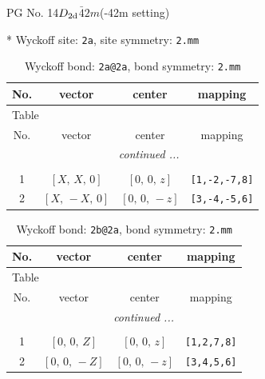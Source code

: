 \documentclass[fleqn,8pt]{jsarticle}
\begin{document}
\setcounter{MaxMatrixCols}{32}

\renewcommand{\tablename}{Table~}
\renewcommand{\figurename}{Figure~}
\begin{center}
\LARGE
PG No. 14\quad$D_{\rm 2d}$\quad$\bar{4}2m$\quad(-42m setting)\quad[ tetragonal ]
\end{center}


* Wyckoff site: {\tt 2a}, site symmetry: {\tt 2.mm}
\renewcommand{\arraystretch}{1.2}
\begin{longtable}{cccc}
\caption{Wyckoff bond: {\tt 2a@2a}, bond symmetry: {\tt 2.mm}}
 \\
 \hline \hline
No. & vector & center & mapping \\ \hline \endfirsthead

\multicolumn{3}{l}{\tablename\ \thetable{}} \\
 \hline \hline
No. & vector & center & mapping \\ \hline \endhead

 \hline \hline
\multicolumn{3}{r}{\footnotesize\it continued ...} \\ \endfoot

 \hline \hline
\multicolumn{3}{r}{} \\ \endlastfoot

1 & $\left[ X,\, X,\, 0 \right]$ & $\left[ 0,\, 0,\, z \right]$ & {\tt [1,-2,-7,8]} \\ \hline
2 & $\left[ X,\, - X,\, 0 \right]$ & $\left[ 0,\, 0,\, - z \right]$ & {\tt [3,-4,-5,6]} \\
\end{longtable}
\renewcommand{\arraystretch}{1.2}
\begin{longtable}{cccc}
\caption{Wyckoff bond: {\tt 2b@2a}, bond symmetry: {\tt 2.mm}}
 \\
 \hline \hline
No. & vector & center & mapping \\ \hline \endfirsthead

\multicolumn{3}{l}{\tablename\ \thetable{}} \\
 \hline \hline
No. & vector & center & mapping \\ \hline \endhead

 \hline \hline
\multicolumn{3}{r}{\footnotesize\it continued ...} \\ \endfoot

 \hline \hline
\multicolumn{3}{r}{} \\ \endlastfoot

1 & $\left[ 0,\, 0,\, Z \right]$ & $\left[ 0,\, 0,\, z \right]$ & {\tt [1,2,7,8]} \\ \hline
2 & $\left[ 0,\, 0,\, - Z \right]$ & $\left[ 0,\, 0,\, - z \right]$ & {\tt [3,4,5,6]} \\
\end{longtable}
\end{document}
